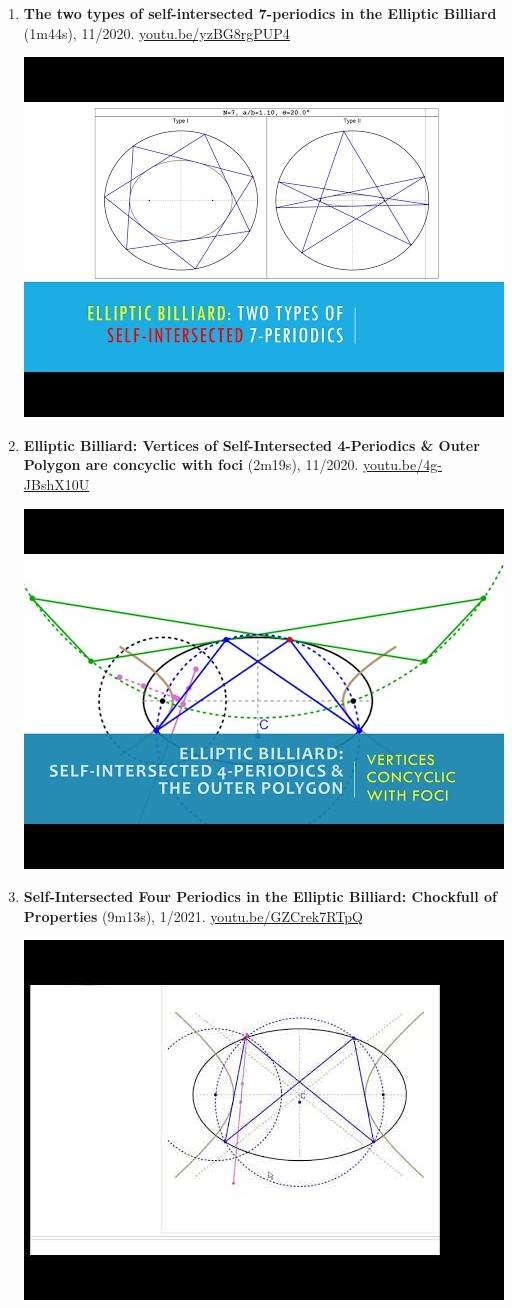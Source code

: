 \documentclass[12pt]{article}
\begin{document}
\begin{enumerate}[resume]
% 
\item \textbf{The two types of self-intersected 7-periodics in the Elliptic Billiard} (1m44s), 11/2020. \href{https://youtu.be/yzBG8rgPUP4}{\url{youtu.be/yzBG8rgPUP4}}
\begin{center}\includegraphics[width=.5\textwidth]{pics/yzBG8rgPUP4.jpg}\end{center}
% 
\item \textbf{Elliptic Billiard: Vertices of Self-Intersected 4-Periodics \& Outer Polygon are concyclic with foci} (2m19s), 11/2020. \href{https://youtu.be/4g-JBshX10U}{\url{youtu.be/4g-JBshX10U}}
\begin{center}\includegraphics[width=.5\textwidth]{pics/4g-JBshX10U.jpg}\end{center}
% 
\item \textbf{Self-Intersected Four Periodics in the Elliptic Billiard: Chockfull of Properties} (9m13s), 1/2021. \href{https://youtu.be/GZCrek7RTpQ}{\url{youtu.be/GZCrek7RTpQ}}
\begin{center}\includegraphics[width=.5\textwidth]{pics/GZCrek7RTpQ.jpg}\end{center}
% 
\end{enumerate}
\end{document}
